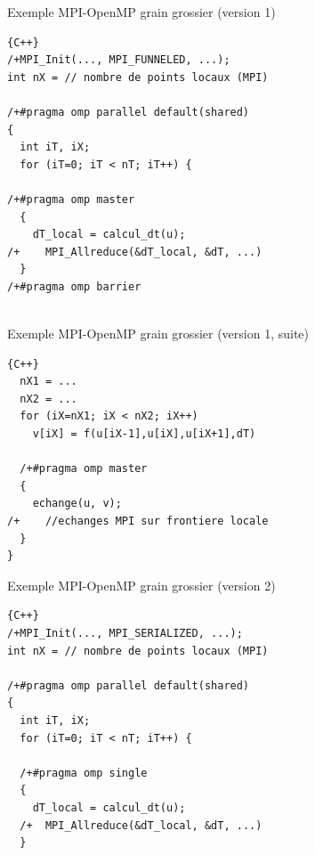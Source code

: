 \documentclass{beamer}
\begin{document}
\begin{frame}[fragile]
Exemple MPI-OpenMP grain grossier
(version 1)


\begin{lstlisting}[firstnumber=1]{C++}
/+MPI_Init(..., MPI_FUNNELED, ...);
int nX = // nombre de points locaux (MPI)
 
/+#pragma omp parallel default(shared)
{
  int iT, iX;
  for (iT=0; iT < nT; iT++) {
  
/+#pragma omp master
  {
    dT_local = calcul_dt(u);
/+    MPI_Allreduce(&dT_local, &dT, ...)
  }
/+#pragma omp barrier
  
\end{lstlisting}

\end{frame}
\begin{frame}[fragile]
	Exemple MPI-OpenMP grain grossier (version 1, suite)
	
	
\begin{lstlisting}[firstnumber=15]{C++}
  nX1 = ...
  nX2 = ...
  for (iX=nX1; iX < nX2; iX++)
    v[iX] = f(u[iX-1],u[iX],u[iX+1],dT)

  /+#pragma omp master
  {
    echange(u, v);
/+    //echanges MPI sur frontiere locale    
  }
}
\end{lstlisting}

\end{frame}
\begin{frame}[fragile]
	Exemple MPI-OpenMP grain grossier (version 2)
	
	
	\begin{lstlisting}[firstnumber=1]{C++}
/+MPI_Init(..., MPI_SERIALIZED, ...);
int nX = // nombre de points locaux (MPI)
	
/+#pragma omp parallel default(shared)
{
  int iT, iX;
  for (iT=0; iT < nT; iT++) {

  /+#pragma omp single
  {
    dT_local = calcul_dt(u);
  /+  MPI_Allreduce(&dT_local, &dT, ...)
  }
	
\end{lstlisting}
	
\end{frame}
\end{document}
